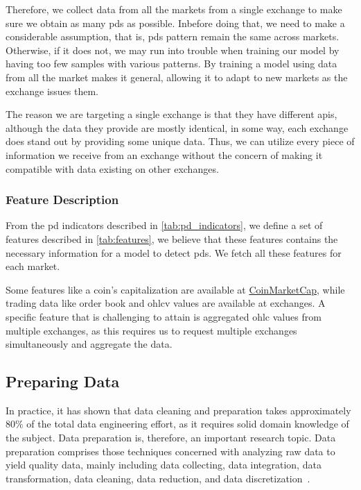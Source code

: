Therefore, we collect data from all the markets from a single exchange to make sure we obtain as many \acp{pd} as possible. Inbefore doing that, we need to make a considerable assumption, that is, \acp{pd} pattern remain the same across markets. Otherwise, if it does not, we may run into trouble when training our model by having too few samples with various patterns. By training a model using data from all the market makes it general, allowing it to adapt to new markets as the exchange issues them. 

The reason we are targeting a single exchange is that they have different \acp{api}, although the data they provide are mostly identical, in some way, each exchange does stand out by providing some unique data. Thus, we can utilize every piece of information we receive from an exchange without the concern of making it compatible with data existing on other exchanges.

\subsubsection{Feature Description}
From the \ac{pd} indicators described in \autoref{tab:pd_indicators}, we define a set of features described in \autoref{tab:features}, we believe that these features contains the necessary information for a model to detect \acp{pd}. We fetch all these features for each market.

Some features like a coin's capitalization are available at \href{https://coinmarketcap.com/}{CoinMarketCap}, while trading data like order book and \ac{ohlcv} values are available at exchanges. A specific feature that is challenging to attain is aggregated \ac{ohlc} values from multiple exchanges, as this requires us to request multiple exchanges simultaneously and aggregate the data.



\newpage
\subsection{Preparing Data}\label{sec:prep}
In practice, it has shown that data cleaning and preparation takes approximately $80\%$ of the total data engineering effort, as it requires solid domain knowledge of the subject. Data preparation is, therefore, an important research topic. Data preparation comprises those techniques concerned with analyzing raw data to yield quality data, mainly including data collecting, data integration, data transformation, data cleaning, data reduction, and data discretization~\cite{zhang2003data}.

